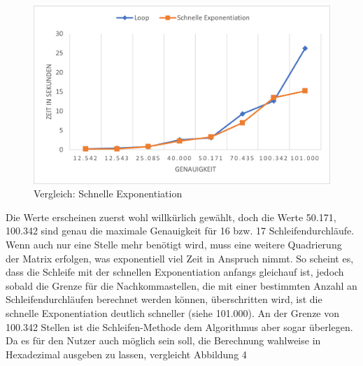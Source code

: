 \documentclass[course=erap]{aspdoc}
\begin{document}
    \begin{figure}
        \centering
        \includegraphics[scale = 1.0]{Images/Fast_NormalExponentiation.png}
        \caption{Vergleich: Schnelle Exponentiation}
        \label{FastExponentiationGraph}
    \end{figure}Die Werte erscheinen zuerst wohl willkürlich gewählt, doch die Werte 50.171, 100.342 sind genau die maximale Genauigkeit für 16 bzw. 17 Schleifendurchläufe. Wenn auch nur eine Stelle mehr benötigt wird, muss eine weitere Quadrierung der Matrix erfolgen, was exponentiell viel Zeit in Anspruch nimmt. So scheint es, dass die Schleife mit der schnellen Exponentiation anfangs gleichauf ist, jedoch sobald die Grenze für die Nachkommastellen, die mit einer bestimmten Anzahl an Schleifendurchläufen berechnet werden können, überschritten wird, ist die schnelle Exponentiation deutlich schneller (siehe 101.000). An der Grenze von 100.342 Stellen ist die Schleifen-Methode dem Algorithmus aber sogar überlegen. Da es für den Nutzer auch möglich sein soll, die Berechnung wahlweise in Hexadezimal ausgeben zu lassen, vergleicht Abbildung 4 \begin{figure}[ht]
                                                                                                                                                                                                                                                                                                                                                                                                                                                                                                                                                                                                                                                                                                                                                                                                                                                                                       \centering

\end{figure}
\end{document}
